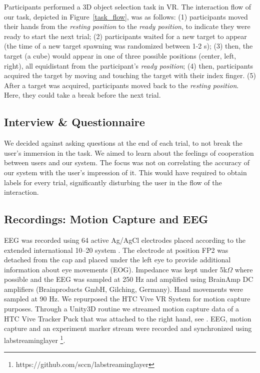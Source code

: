  Participants performed a 3D object selection task in VR. The interaction flow of our task, depicted in Figure~\ref{task_flow}, was as follows: (1) participants moved their hands from the \textit{resting position} to the \textit{ready position}, to indicate they were ready to start the next trial; (2) participants waited for a new target to appear (the time of a new target spawning was randomized between 1-2 s); (3) then, the target (a cube) would appear in one of three possible positions (center, left, right), all equidistant from the participant's \textit{ready position}; (4) then, participants acquired the target by moving and touching the target with their index finger. (5) After a target was acquired, participants moved back to the \textit{resting position}. Here, they could take a break before the next trial. 


\subsection{Interview \& Questionnaire}

We decided against asking questions at the end of each trial, to not break the user's immersion in the task. We aimed to learn about the feelings of cooperation between users and our system. The focus was not on correlating the accuracy of our system with the user's impression of it. This would have required to obtain labels for every trial, significantly disturbing the user in the flow of the interaction.

\subsection{Recordings: Motion Capture and EEG}
EEG was recorded using 64 active Ag/AgCl electrodes placed according to the extended international 10–20 system \cite{Chatrian1985-ys}. The electrode at position FP2 was detached from the cap and placed under the left eye to provide additional information about eye movements (EOG). Impedance was kept under 5k$\Omega$ where possible and the EEG was sampled at 250 Hz and amplified using BrainAmp DC amplifiers (Brainproducts GmbH, Gilching, Germany). Hand movements were sampled at 90 Hz. We repurposed the HTC Vive VR System for motion capture purposes. Through a Unity3D routine we streamed motion capture data of a HTC Vive Tracker Puck that was attached to the right hand, see . EEG, motion capture and an experiment marker stream were recorded and synchronized using labstreaminglayer \footnote{https://github.com/sccn/labstreaminglayer}.

